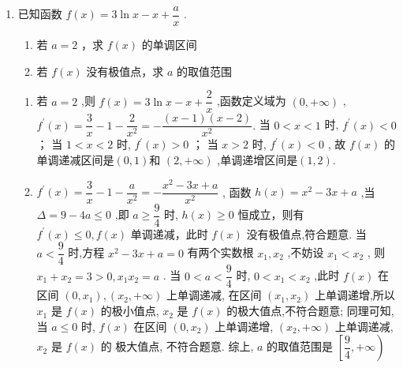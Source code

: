 \begin{enumerate}
\begin{jieda}
    \end{jieda}
    \item 已知函数 $f\left( x\right)  = 3\ln x - x + \dfrac{a}{x}$ .
    \begin{enumerate}
        \item 若 $a = 2$ ，求 $f\left( x\right)$ 的单调区间
        \item 若 $f\left( x\right)$ 没有极值点，求 $a$ 的取值范围
    \end{enumerate}
    \begin{jieda}
        \begin{enumerate}
            \item 若 $a = 2$ ,则 $f\left( x\right)  = 3\ln x - x + \dfrac{2}{x}$ ,函数定义域为 $\left( {0, + \infty }\right)$ ,
            ${f}^{\prime }\left( x\right)  = \dfrac{3}{x} - 1 - \dfrac{2}{{x}^{2}} =  - \dfrac{\left( {x - 1}\right) \left( {x - 2}\right) }{{x}^{2}}.$
            当 $0 < x < 1$ 时, ${f}^{\prime }\left( x\right)  < 0$ ；
            当 $1 < x < 2$ 时, ${f}^{\prime }\left( x\right)  > 0$ ；
            当 $x > 2$ 时, ${f}^{\prime }\left( x\right)  < 0$ ,
            故 $f\left( x\right)$ 的单调递减区间是$(0,1)$和 $\left( {2, + \infty }\right)$ ,单调递增区间是$(1,2)$.
            \item ${f}^{\prime }\left( x\right)  = \dfrac{3}{x} - 1 - \dfrac{a}{{x}^{2}} =  - \dfrac{{x}^{2} - {3x} + a}{{x}^{2}}$ ,
            函数 $h\left( x\right)  = {x}^{2} - {3x} + a$ ,当 $\Delta  = 9 - {4a} \leq  0$ ,即 $a \geq  \dfrac{9}{4}$ 时, $h\left( x\right)  \geq  0$ 恒成立，则有 ${f}^{\prime }\left( x\right)  \leq  0,f\left( x\right)$ 单调递减，此时 $f\left( x\right)$ 没有极值点,符合题意.
            当 $a < \dfrac{9}{4}$ 时,方程 ${x}^{2} - {3x} + a = 0$ 有两个实数根 ${x}_{1},{x}_{2}$ ,不妨设 ${x}_{1} < {x}_{2}$ ,
            则 ${x}_{1} + {x}_{2} = 3 > 0,{x}_{1}{x}_{2} = a$ .
            当 $0 < a < \dfrac{9}{4}$ 时, $0 < {x}_{1} < {x}_{2}$ ,此时 $f\left( x\right)$ 在区间 $\left( {0,{x}_{1}}\right) ,\left( {{x}_{2}, + \infty }\right)$ 上单调递减,
            在区间 $\left( {{x}_{1},{x}_{2}}\right)$ 上单调递增,所以 ${x}_{1}$ 是 $f\left( x\right)$ 的极小值点, ${x}_{2}$ 是 $f\left( x\right)$ 的极大值点,不符合题意;
            同理可知,当 $a \leq  0$ 时, $f\left( x\right)$ 在区间 $\left( {0,{x}_{2}}\right)$ 上单调递增, $\left( {{x}_{2}, + \infty }\right)$ 上单调递减, ${x}_{2}$ 是 $f\left( x\right)$ 的
            极大值点, 不符合题意.
            综上, $a$ 的取值范围是 $\left\lbrack  {\dfrac{9}{4}, + \infty }\right)$
        \end{enumerate}
    \end{jieda}
\end{enumerate}

